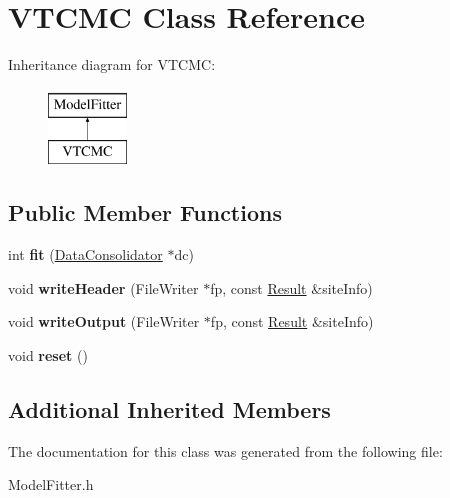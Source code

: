 \hypertarget{classVTCMC}{\section{V\-T\-C\-M\-C Class Reference}
\label{classVTCMC}
}
Inheritance diagram for V\-T\-C\-M\-C\-:\begin{figure}[H]
\begin{center}
\leavevmode
\includegraphics[height=2.000000cm]{classVTCMC}
\end{center}
\end{figure}
\subsection*{Public Member Functions}
\begin{DoxyCompactItemize}
\item 
\hypertarget{classVTCMC_a7cdc21d7325fa2fd95d6f59bcaa9377a}{int {\bfseries fit} (\hyperlink{classDataConsolidator}{Data\-Consolidator} $\ast$dc)}\label{classVTCMC_a7cdc21d7325fa2fd95d6f59bcaa9377a}

\item 
\hypertarget{classVTCMC_a151cc09b8883efd4d08bef2e5588d1fe}{void {\bfseries write\-Header} (File\-Writer $\ast$fp, const \hyperlink{classResult}{Result} \&site\-Info)}\label{classVTCMC_a151cc09b8883efd4d08bef2e5588d1fe}

\item 
\hypertarget{classVTCMC_aa8f82bde6bc4ac931cdb6964bb1b25ff}{void {\bfseries write\-Output} (File\-Writer $\ast$fp, const \hyperlink{classResult}{Result} \&site\-Info)}\label{classVTCMC_aa8f82bde6bc4ac931cdb6964bb1b25ff}

\item 
\hypertarget{classVTCMC_ac2f5aaabdd65cc4b22c254846f4a7a65}{void {\bfseries reset} ()}\label{classVTCMC_ac2f5aaabdd65cc4b22c254846f4a7a65}

\end{DoxyCompactItemize}
\subsection*{Additional Inherited Members}


The documentation for this class was generated from the following file\-:\begin{DoxyCompactItemize}
\item 
Model\-Fitter.\-h\end{DoxyCompactItemize}
